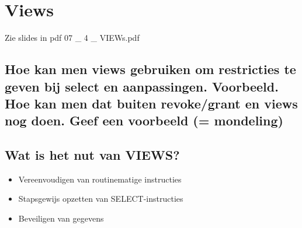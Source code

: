 \newpage

\section{Views}

Zie slides in pdf 07 \_ 4 \_ VIEWs.pdf

\subsection{Hoe kan men views gebruiken om restricties te geven bij select en aanpassingen.
Voorbeeld. Hoe kan men dat buiten revoke/grant en views nog doen. Geef een voorbeeld (= mondeling)}



\subsection{Wat is het nut van VIEWS?}

\begin{itemize}
\item Vereenvoudigen van routinematige instructies
\item Stapsgewijs opzetten van SELECT-instructies
\item Beveiligen van gegevens
\end{itemize}